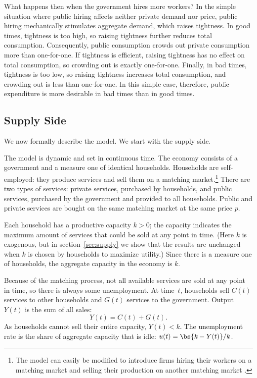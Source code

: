 \documentclass[letterpaper,12pt,leqno]{article}
\begin{document}
\begin{bibunit}
What happens then when the government hires more workers? In the simple situation where public hiring affects neither private demand nor price, public hiring mechanically stimulates aggregate demand, which raises tightness. In good times, tightness is too high, so raising tightness further reduces total consumption. Consequently, public consumption crowds out private consumption more than one-for-one. If tightness is efficient, raising tightness has no effect on total consumption, so crowding out is exactly one-for-one. Finally, in bad times, tightness is too low, so raising tightness increases total consumption, and crowding out is less than one-for-one. In this simple case, therefore, public expenditure is more desirable in bad times than in good times.

\subsection{Supply Side}

We now formally describe the model. We start with the supply side. 

The model is dynamic and set in continuous time. The economy consists of a government and a measure one of identical households. Households are self-employed: they produce services and sell them on a matching market.\footnote{The model can easily be modified to introduce firms hiring their workers on a matching market and selling their production on another matching market .} There are two types of services: private services, purchased by households, and public services, purchased by the government and provided to all households. Public and private services are bought on the same matching market at the same price $p$.

Each household has a productive capacity $k>0$; the capacity indicates the maximum amount of services that could be sold at any point in time. (Here $k$ is exogenous, but in section~\ref{sec:supply} we show that the results are unchanged when $k$ is chosen by households to maximize utility.) Since there is a measure one of households, the aggregate capacity in the economy is $k$. 

Because of the matching process, not all available services are sold at any point in time, so there is always some unemployment. At time~$t$, households sell $C(t)$ services to other households and $G(t)$ services to the government. Output $Y(t)$ is the sum of all sales:
\begin{equation*}
Y(t)=C(t)+G(t).
\end{equation*}
As households cannot sell their entire capacity, $Y(t)<k$. The unemployment rate is the share of aggregate capacity that is idle: $u(t) = \bs{k-Y(t)}/k$.


\end{bibunit}
\end{document}
